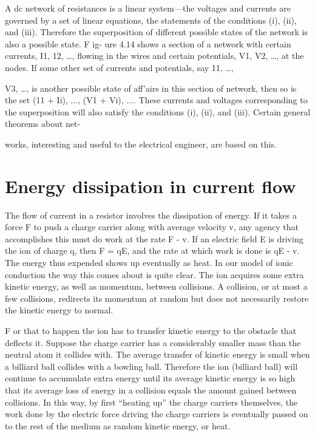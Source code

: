 A dc network of resistances is a linear system---the voltages and
currents are governed by a set of linear equations, the statements of
the conditions (i), (ii), and (iii). Therefore the superposition of
different possible states of the network is also a possible state. F ig-
ure 4.14 shows a section of a network with certain currents, I1,
12, \ldots , flowing in the wires and certain potentials, V1, V2, \ldots , at
the nodes. If some other set of currents and potentials, say 11, \ldots ,

V3, \ldots , is another possible state of aff'airs in this section of network,
then so is the set (11 + Ii), ..., (V1 + Vi), .... These currents
and voltages corresponding to the superposition will also satisfy the
conditions (i), (ii), and (iii). Certain general theorems about net-

works, interesting and useful to the electrical engineer, are based
on this.

\section{Energy dissipation in current flow}

The flow of current in a resistor involves the dissipation of energy.
If it takes a force F to push a charge carrier along with average
velocity v, any agency that accomplishes this must do work at the
rate F - v. If an electric field E is driving the ion of charge q, then
F = qE, and the rate at which work is done is qE - v. The energy
thus expended shows up eventually as heat. In our model of ionic
conduction the way this comes about is quite clear. The ion acquires
some extra kinetic energy, as well as momentum, between collisions.
A collision, or at most a few collisions, redirects its momentum at
random but does not necessarily restore the kinetic energy to normal.

F or that to happen the ion has to transfer kinetic energy to the obstacle
that deflects it. Suppose the charge carrier has a considerably
smaller mass than the neutral atom it collides with. The average
transfer of kinetic energy is small when a billiard ball collides with
a bowling ball. Therefore the ion (billiard ball) will continue to
accumulate extra energy until its average kinetic energy is so high
that its average loss of energy in a collision equals the amount gained
between collisions. In this way, by first ``heating up'' the charge
carriers themselves, the work done by the electric force driving the
charge carriers is eventually passed on to the rest of the medium as
random kinetic energy, or heat.

